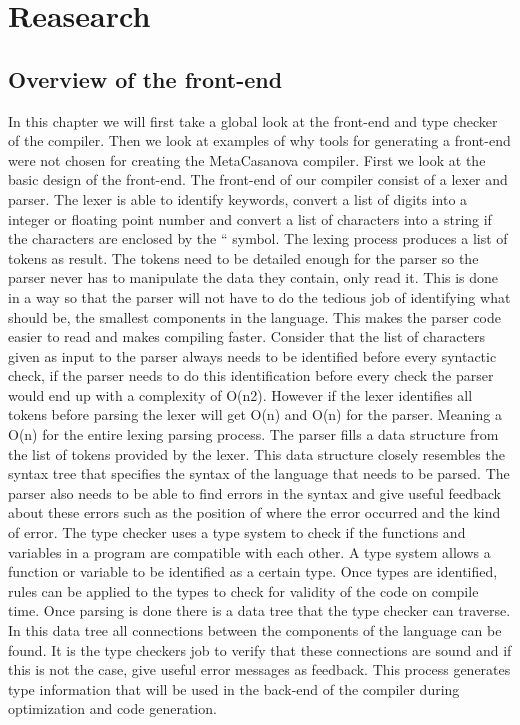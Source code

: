\section{Reasearch}

\subsection{Overview of the front-end}

In this chapter we will first take a global look at the front-end and type checker of the compiler. Then we look at examples of why tools for generating a front-end were not chosen for creating the MetaCasanova compiler. 
\linebreak
First we look at the basic design of the front-end. The front-end of our compiler consist of a lexer and parser. The lexer is able to identify keywords, convert a list of digits into a integer or floating point number and convert a list of characters into a string if the characters are enclosed by the “ symbol. The lexing process produces a list of tokens as result. 
\linebreak
The tokens need to be detailed enough for the parser so the parser never has to manipulate the data they contain, only read it. This is done in a way so that the parser will not have to do the tedious job of identifying what should be, the smallest components in the language. This makes the parser code easier to read and makes compiling faster. Consider that the list of characters given as input to the parser always needs to be identified before every syntactic check, if the parser needs to do this identification before every check the parser would end up with a complexity of O(n2). However if the lexer identifies all tokens before parsing the lexer will get O(n) and O(n) for the parser. Meaning a O(n) for the entire lexing parsing process. 
\linebreak
The parser fills a data structure from the list of tokens provided by the lexer. This data structure closely resembles the syntax tree that specifies the syntax of the language that needs to be parsed. The parser also needs to be able to find errors in the syntax and give useful feedback about these errors such as the position of where the error occurred and the kind of error. 
\linebreak
The type checker uses a type system to check if the functions and variables in a program are compatible with each other. A type system allows a function or variable to be identified as a certain type. Once types are identified, rules can be applied to the types to check for validity of the code on compile time. 
\linebreak
Once parsing is done there is a data tree that the type checker can traverse. In this data tree all connections between the components of the language can be found. It is the type checkers job to verify that these connections are sound and if this is not the case, give useful error messages as feedback. This process generates type information that will be used in the back-end of the compiler during optimization and code generation. 

